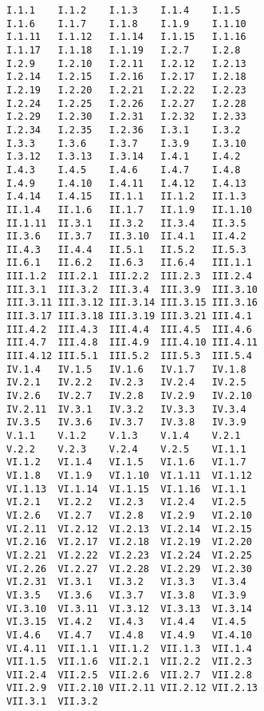 \documentclass[main.tex]{subfiles}
\begin{document}
\noindent
\begin{verbatim}
I.1.1    I.1.2    I.1.3    I.1.4    I.1.5
I.1.6    I.1.7    I.1.8    I.1.9    I.1.10
I.1.11   I.1.12   I.1.14   I.1.15   I.1.16
I.1.17   I.1.18   I.1.19   I.2.7    I.2.8
I.2.9    I.2.10   I.2.11   I.2.12   I.2.13
I.2.14   I.2.15   I.2.16   I.2.17   I.2.18
I.2.19   I.2.20   I.2.21   I.2.22   I.2.23
I.2.24   I.2.25   I.2.26   I.2.27   I.2.28
I.2.29   I.2.30   I.2.31   I.2.32   I.2.33
I.2.34   I.2.35   I.2.36   I.3.1    I.3.2
I.3.3    I.3.6    I.3.7    I.3.9    I.3.10
I.3.12   I.3.13   I.3.14   I.4.1    I.4.2
I.4.3    I.4.5    I.4.6    I.4.7    I.4.8
I.4.9    I.4.10   I.4.11   I.4.12   I.4.13
I.4.14   I.4.15   II.1.1   II.1.2   II.1.3
II.1.4   II.1.6   II.1.7   II.1.9   II.1.10
II.1.11  II.3.1   II.3.2   II.3.4   II.3.5
II.3.6   II.3.7   II.3.10  II.4.1   II.4.2
II.4.3   II.4.4   II.5.1   II.5.2   II.5.3
II.6.1   II.6.2   II.6.3   II.6.4   III.1.1
III.1.2  III.2.1  III.2.2  III.2.3  III.2.4
III.3.1  III.3.2  III.3.4  III.3.9  III.3.10
III.3.11 III.3.12 III.3.14 III.3.15 III.3.16
III.3.17 III.3.18 III.3.19 III.3.21 III.4.1
III.4.2  III.4.3  III.4.4  III.4.5  III.4.6
III.4.7  III.4.8  III.4.9  III.4.10 III.4.11
III.4.12 III.5.1  III.5.2  III.5.3  III.5.4
IV.1.4   IV.1.5   IV.1.6   IV.1.7   IV.1.8
IV.2.1   IV.2.2   IV.2.3   IV.2.4   IV.2.5
IV.2.6   IV.2.7   IV.2.8   IV.2.9   IV.2.10
IV.2.11  IV.3.1   IV.3.2   IV.3.3   IV.3.4
IV.3.5   IV.3.6   IV.3.7   IV.3.8   IV.3.9
V.1.1    V.1.2    V.1.3    V.1.4    V.2.1
V.2.2    V.2.3    V.2.4    V.2.5    VI.1.1
VI.1.2   VI.1.4   VI.1.5   VI.1.6   VI.1.7
VI.1.8   VI.1.9   VI.1.10  VI.1.11  VI.1.12
VI.1.13  VI.1.14  VI.1.15  VI.1.16  VI.1.1
VI.2.1   VI.2.2   VI.2.3   VI.2.4   VI.2.5
VI.2.6   VI.2.7   VI.2.8   VI.2.9   VI.2.10
VI.2.11  VI.2.12  VI.2.13  VI.2.14  VI.2.15
VI.2.16  VI.2.17  VI.2.18  VI.2.19  VI.2.20
VI.2.21  VI.2.22  VI.2.23  VI.2.24  VI.2.25
VI.2.26  VI.2.27  VI.2.28  VI.2.29  VI.2.30
VI.2.31  VI.3.1   VI.3.2   VI.3.3   VI.3.4
VI.3.5   VI.3.6   VI.3.7   VI.3.8   VI.3.9
VI.3.10  VI.3.11  VI.3.12  VI.3.13  VI.3.14
VI.3.15  VI.4.2   VI.4.3   VI.4.4   VI.4.5
VI.4.6   VI.4.7   VI.4.8   VI.4.9   VI.4.10
VI.4.11  VII.1.1  VII.1.2  VII.1.3  VII.1.4
VII.1.5  VII.1.6  VII.2.1  VII.2.2  VII.2.3
VII.2.4  VII.2.5  VII.2.6  VII.2.7  VII.2.8
VII.2.9  VII.2.10 VII.2.11 VII.2.12 VII.2.13
VII.3.1  VII.3.2
\end{verbatim}
\end{document}
